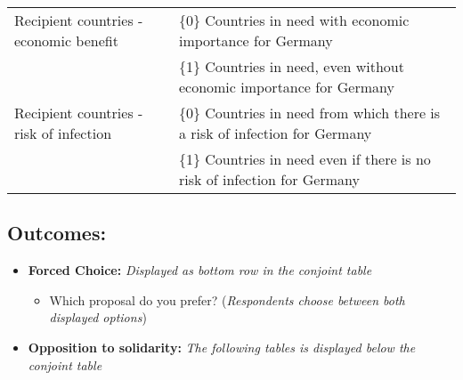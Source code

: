\documentclass[12pt,oneside,smallheadings,chapterprefix=true]{article}
\begin{document}
\begin{longtable}[]{@{}ll@{}}
\begin{minipage}[t]{0.40\columnwidth}
Recipient countries - economic benefit\strut
\end{minipage} & \begin{minipage}[t]{0.54\columnwidth}\raggedright
\{0\} Countries in need with economic importance for Germany\strut
\end{minipage}\tabularnewline
\begin{minipage}[t]{0.40\columnwidth}\raggedright
\strut
\end{minipage} & \begin{minipage}[t]{0.54\columnwidth}\raggedright
\{1\} Countries in need, even without economic importance for
Germany\strut
\end{minipage}\tabularnewline
\begin{minipage}[t]{0.40\columnwidth}\raggedright
Recipient countries - risk of infection\strut
\end{minipage} & \begin{minipage}[t]{0.54\columnwidth}\raggedright
\{0\} Countries in need from which there is a risk of infection for
Germany\strut
\end{minipage}\tabularnewline
\begin{minipage}[t]{0.40\columnwidth}\raggedright
\strut
\end{minipage} & \begin{minipage}[t]{0.54\columnwidth}\raggedright
\{1\} Countries in need even if there is no risk of infection for
Germany\strut
\end{minipage}\tabularnewline
\bottomrule
\end{longtable}

\hypertarget{outcomes}{%
\subsection{Outcomes:}\label{outcomes}}

\begin{itemize}
\tightlist
\item
  \textbf{Forced Choice:} \emph{Displayed as bottom row in the conjoint
  table}

  \begin{itemize}
  \tightlist
  \item
    Which proposal do you prefer? (\emph{Respondents choose between both
    displayed options})
  \end{itemize}
\end{itemize}

\begin{itemize}
\tightlist
\item
  \textbf{Opposition to solidarity:} \emph{The following tables is
  displayed below the conjoint table}
\end{itemize}
\end{document}
